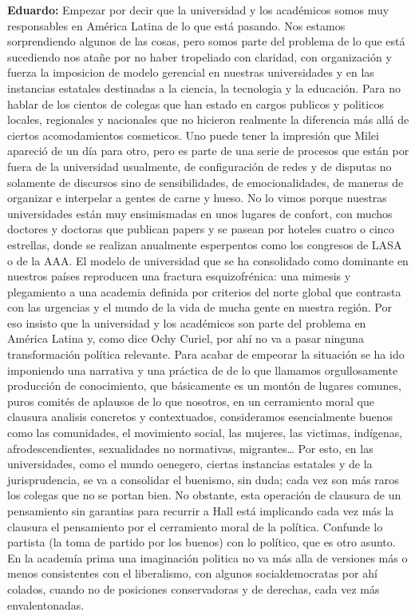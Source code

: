 \documentclass[
]{interact}
\begin{document}
\textbf{Eduardo:} Empezar por decir que la universidad y los académicos
somos muy responsables en América Latina de lo que está pasando. Nos
estamos sorprendiendo algunos de las cosas, pero somos parte del
problema de lo que está sucediendo nos atañe por no haber tropeliado con
claridad, con organización y fuerza la imposicion de modelo gerencial en
nuestras universidades y en las instancias estatales destinadas a la
ciencia, la tecnologia y la educación. Para no hablar de los cientos de
colegas que han estado en cargos publicos y politicos locales,
regionales y nacionales que no hicieron realmente la diferencia más allá
de ciertos acomodamientos cosmeticos. Uno puede tener la impresión que
Milei apareció de un día para otro, pero es parte de una serie de
procesos que están por fuera de la universidad usualmente, de
configuración de redes y de disputas no solamente de discursos sino de
sensibilidades, de emocionalidades, de maneras de organizar e interpelar
a gentes de carne y hueso. No lo vimos porque nuestras universidades
están muy ensimismadas en unos lugares de confort, con muchos doctores y
doctoras que publican papers y se pasean por hoteles cuatro o cinco
estrellas, donde se realizan anualmente esperpentos como los congresos
de LASA o de la AAA. El modelo de universidad que se ha consolidado como
dominante en nuestros países reproducen una fractura esquizofrénica: una
mimesis y plegamiento a una academia definida por criterios del norte
global que contrasta con las urgencias y el mundo de la vida de mucha
gente en nuestra región. Por eso insisto que la universidad y los
académicos son parte del problema en América Latina y, como dice Ochy
Curiel, por ahí no va a pasar ninguna transformación política relevante.
Para acabar de empeorar la situación se ha ido imponiendo una narrativa
y una práctica de de lo que llamamos orgullosamente producción de
conocimiento, que básicamente es un montón de lugares comunes, puros
comités de aplausos de lo que nosotros, en un cerramiento moral que
clausura analisis concretos y contextuados, consideramos esencialmente
buenos como las comunidades, el movimiento social, las mujeres, las
victimas, indígenas, afrodescendientes, sexualidades no normativas,
migrantes\ldots{} Por esto, en las universidades, como el mundo
oenegero, ciertas instancias estatales y de la jurisprudencia, se va a
consolidar el buenismo, sin duda; cada vez son más raros los colegas que
no se portan bien. No obstante, esta operación de clausura de un
pensamiento sin garantias para recurrir a Hall está implicando cada vez
más la clausura el pensamiento por el cerramiento moral de la política.
Confunde lo partista (la toma de partido por los buenos) con lo
político, que es otro asunto. En la academía prima una imaginación
politica no va más alla de versiones más o menos consistentes con el
liberalismo, con algunos socialdemocratas por ahí colados, cuando no de
posiciones conservadoras y de derechas, cada vez más envalentonadas.
\end{document}
